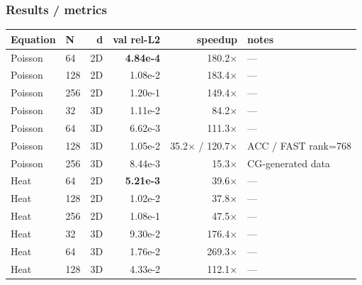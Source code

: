 \subsubsection*{Results / metrics}
\begin{center}
\begin{tabular}{l l r r r l}
  \textbf{Equation} & \textbf{N} & \textbf{d} & \textbf{val rel-L2} & \textbf{speedup} & \textbf{notes} \\
  \hline
  Poisson & 64  & 2D & \textbf{4.84e-4} & 180.2$\times$        & --- \\
  Poisson & 128 & 2D & 1.08e-2          & 183.4$\times$        & --- \\
  Poisson & 256 & 2D & 1.20e-1          & 149.4$\times$        & --- \\
  Poisson & 32  & 3D & 1.11e-2          & 84.2$\times$         & --- \\
  Poisson & 64  & 3D & 6.62e-3          & 111.3$\times$        & --- \\
  Poisson & 128 & 3D & 1.05e-2          & 35.2$\times$ / 120.7$\times$ & ACC / FAST rank=768 \\
  Poisson & 256 & 3D & 8.44e-3          & 15.3$\times$         & CG-generated data \\
  \hline
  Heat    & 64  & 2D & \textbf{5.21e-3} & 39.6$\times$         & --- \\
  Heat    & 128 & 2D & 1.02e-2          & 37.8$\times$         & --- \\
  Heat    & 256 & 2D & 1.08e-1          & 47.5$\times$         & --- \\
  Heat    & 32  & 3D & 9.30e-2          & 176.4$\times$        & --- \\
  Heat    & 64  & 3D & 1.76e-2          & 269.3$\times$        & --- \\
  Heat    & 128 & 3D & 4.33e-2          & 112.1$\times$        & --- \\
\end{tabular}
\end{center}

